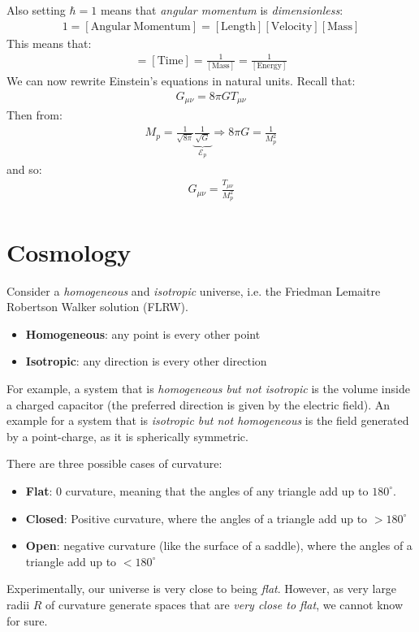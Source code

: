 \documentclass[../template.tex]{subfiles}
\begin{document}
Also setting $\hbar=1$ means that \textit{angular momentum} is \textit{dimensionless}:
\begin{align*}
    1 = [\mathrm{Angular\ Momentum}] = [\mathrm{Length} ][\mathrm{Velocity} ][\mathrm{Mass}]
\end{align*}   
This means that:
\begin{align*}
    [\mathrm{Length} ] = [\mathrm{Time} ] = \frac{1}{[\mathrm{Mass}] } = \frac{1}{[\mathrm{Energy} ]}  
\end{align*}
We can now rewrite Einstein's equations in natural units. Recall that:
\begin{align*}
    G_{\mu \nu} = 8 \pi G T_{\mu \nu}
\end{align*}
Then from:
\begin{align*}
    M_p = \frac{1}{\sqrt{8 \pi}} \underbrace{\frac{1}{\sqrt{G}}}_{\mathcal{E}_p} \Rightarrow 8 \pi G = \frac{1}{M_p^2}   
\end{align*}
and so:
\begin{align*}
    G_{\mu \nu} = \frac{T_{\mu \nu}}{M_p^2} 
\end{align*}

\section{Cosmology}
Consider a \textit{homogeneous} and \textit{isotropic} universe, i.e. the Friedman Lemaitre Robertson Walker solution (FLRW).
\begin{itemize}
    \item \textbf{Homogeneous}: any point is  every other point
    \item \textbf{Isotropic}: any direction is  every other direction 
\end{itemize}
For example, a system that is \textit{homogeneous but not isotropic} is the volume inside a charged capacitor (the preferred direction is given by the electric field). An example for a system that is \textit{isotropic but not homogeneous} is the field generated by a point-charge, as it is spherically symmetric.

\medskip

There are three possible cases of curvature:
\begin{itemize}
    \item \textbf{Flat}: $0$ curvature, meaning that the angles of any triangle add up to $180^\circ$.
    \item \textbf{Closed}: Positive curvature, where the angles of a triangle add up to $>180^\circ$
    \item \textbf{Open}: negative curvature (like the surface of a saddle), where the angles of a triangle add up to $<180^\circ$   
\end{itemize}
Experimentally, our universe is very close to being \textit{flat}. However, as very large radii $R$ of curvature generate spaces that are \textit{very close to flat}, we cannot know for sure.
\end{document}
